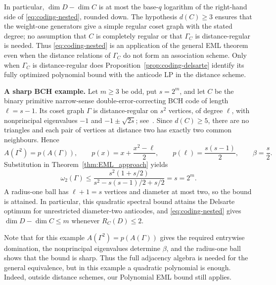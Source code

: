 \documentclass[10pt,a4paper]{article}
\theoremstyle{plain}
\numberwithin{equation}{section}
\begin{document}
In particular, $\dim D-\dim C$ is at most the base-$q$ logarithm of the right-hand side of \eqref{eq:coding-nested}, rounded down. The hypothesis $d(C)\ge3$ ensures that the weight-one generators give a simple regular coset graph with the stated degree; no assumption that $C$ is completely regular or that $\Gamma_C$ is distance-regular is needed. Thus \eqref{eq:coding-nested} is an application of the general EML theorem even when the distance relations of $\Gamma_C$ do not form an association scheme. Only when $\Gamma_C$ is distance-regular does Proposition~\ref{prop:coding-delsarte} identify its fully optimized polynomial bound with the anticode LP in the distance scheme.


\medskip
\textbf{A sharp BCH example.}
Let $m\ge3$ be odd, put $s=2^m$, and let $C$ be the binary primitive
narrow-sense double-error-correcting BCH code of length $\ell=s-1$.
Its coset graph $\Gamma$ is distance-regular on $s^2$ vertices, of degree
$\ell$, with nonprincipal eigenvalues
$-1$ and $-1\pm\sqrt{2s}$; see~\cite{vanDam_FonderFlaass_2000}.
Since $d(C)\ge5$, there are no triangles and each pair of vertices at
distance two has exactly two common neighbours. Hence
\[
 A(\Gamma^2)=p(A(\Gamma)),\qquad
 p(x)=x+\frac{x^2-\ell}{2},\qquad
 p(\ell)=\frac{s(s-1)}2,\qquad \beta=\frac s2.
\]
Substitution in Theorem~\ref{thm:EML_approach} yields
\begin{equation}\label{eq:coding-bch}
 \omega_2(\Gamma)\le
 \frac{s^2(1+s/2)}{s^2-s(s-1)/2+s/2}=s=2^m.
\end{equation}
A radius-one ball has $\ell+1=s$ vertices and diameter at most two, so
the bound is attained. In particular, this quadratic spectral bound attains the Delsarte optimum for unrestricted diameter-two
anticodes, and \eqref{eq:coding-nested} gives
$\dim D-\dim C\le m$ whenever $R_C(D)\le2$.



Note that for this example $A(\Gamma^2)=p(A(\Gamma))$ gives the required entrywise domination, the nonprincipal eigenvalues determine $\beta$, and the radius-one ball shows that the bound is sharp. Thus the full adjacency algebra is needed for the general equivalence, but in this example a quadratic polynomial is enough. Indeed, outside distance schemes, our Polynomial EML bound still applies.%


 
\end{document}
